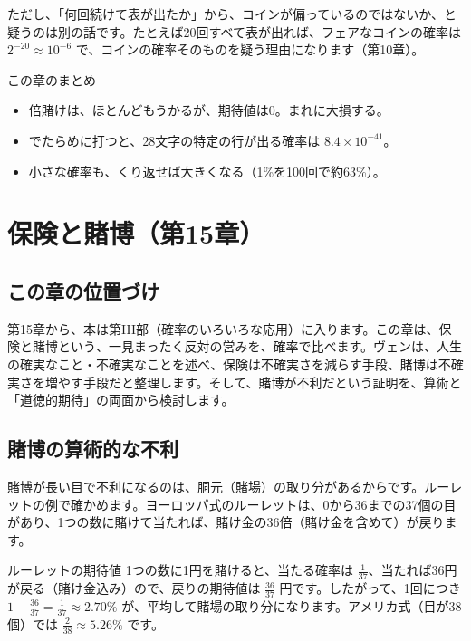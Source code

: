 \documentclass[a4paper,11pt,openany]{ltjsbook}
\begin{document}
ただし、「何回続けて表が出たか」から、コインが偏っているのではないか、と疑うのは別の話です。たとえば20回すべて表が出れば、フェアなコインの確率は $2^{-20}\approx10^{-6}$ で、コインの確率そのものを疑う理由になります（第10章）。

\begin{pointbox}{この章のまとめ}
\begin{itemize}[leftmargin=*]
\item 倍賭けは、ほとんどもうかるが、期待値は0。まれに大損する。
\item でたらめに打つと、28文字の特定の行が出る確率は $8.4\times10^{-41}$。
\item 小さな確率も、くり返せば大きくなる（1\%を100回で約63\%）。
\end{itemize}
\end{pointbox}

\chapter{保険と賭博（第15章）}

\section{この章の位置づけ}

第15章から、本は第III部（確率のいろいろな応用）に入ります。この章は、保険と賭博という、一見まったく反対の営みを、確率で比べます。ヴェンは、人生の確実なこと・不確実なことを述べ、保険は不確実さを減らす手段、賭博は不確実さを増やす手段だと整理します。そして、賭博が不利だという証明を、算術と「道徳的期待」の両面から検討します。

\section{賭博の算術的な不利}

賭博が長い目で不利になるのは、胴元（賭場）の取り分があるからです。ルーレットの例で確かめます。ヨーロッパ式のルーレットは、0から36までの37個の目があり、1つの数に賭けて当たれば、賭け金の36倍（賭け金を含めて）が戻ります。

\begin{examplebox}{ルーレットの期待値}
1つの数に1円を賭けると、当たる確率は $\tfrac1{37}$、当たれば36円が戻る（賭け金込み）ので、戻りの期待値は $\tfrac{36}{37}$ 円です。したがって、1回につき $1-\tfrac{36}{37}=\tfrac1{37}\approx2.70\%$ が、平均して賭場の取り分になります。アメリカ式（目が38個）では $\tfrac2{38}\approx5.26\%$ です。
\end{examplebox}
\end{document}
